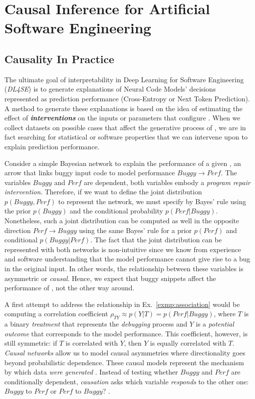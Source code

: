 \chapter{Causal Inference for Artificial Software Engineering }
\label{ch:causality}

\section{Causality In Practice}
\label{sec:pre-ci4se}
The ultimate goal of interpretability in Deep Learning for Software Engineering (\textit{DL4SE}) is to generate explanations of Neural Code Models' decisions represented as prediction performance (\ie Cross-Entropy or Next Token Prediction). A method to generate these explanations is based on the idea of estimating the effect of \textbf{\textit{interventions}} on the inputs or parameters that configure \nlms. When we collect datasets on possible cases that affect the generative process of \nlms, we are in fact searching for statistical or software properties that we can intervene upon to explain prediction performance. 

\begin{exmp}
\label{exmp:association}
Consider a simple Bayesian network to explain the performance of a given \nlm, an arrow that links buggy input code to model performance $Buggy\to Perf$. The variables $Buggy$ and $Perf$ are dependent, both variables embody a \textit{program repair intervention}. Therefore, if we want to define the joint distribution $p(Buggy,Perf)$ to represent the network, we must specify by Bayes' rule using the prior $p(Buggy)$ and the conditional probability $p(Perf|Buggy)$. Nonetheless, such a joint distribution can be computed as well in the opposite direction  $Perf\to Buggy$ using the same Bayes' rule for a prior $p(Perf)$ and conditional $p(Buggy|Perf)$. The fact that the joint distribution can be represented with both networks is non-intuitive since we know from experience and software understanding that the model performance cannot give rise to a bug in the original input. In other words, the relationship between these variables is asymmetric or \textit{causal}. Hence, we expect that buggy snippets affect the performance of \nlms, not the other way around.
\end{exmp}

A first attempt to address the relationship in Ex.~\ref{exmp:association} would be computing a correlation coefficient $\rho_{TY}\approx p(Y|T)=p(Perf|Buggy)$, where $T$ is a binary \textit{treatment} that represents the \textit{debugging} process and $Y$ is a \textit{potential outcome} that corresponds to the model performance. This coefficient, however, is still symmetric: if $T$ is correlated with $Y$, then $Y$ is equally correlated with $T$. \textit{Causal networks} allow us to model causal asymmetries where directionality goes beyond probabilistic dependence. These causal models represent the mechanism by which data \textit{were generated} \cite{Pearl2016Causality}. Instead of testing whether $Buggy$ and $Perf$ are conditionally dependent, \textit{causation} asks which variable \textit{responds} to the other one: $Buggy$ to $Perf$ or $Perf$ to $Buggy$? \cite{Pearl2016Causality}.

